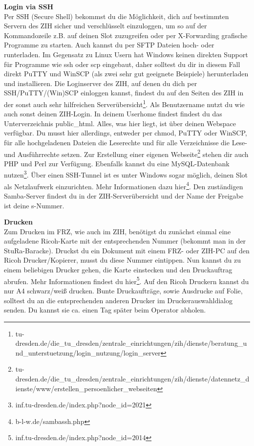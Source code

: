 \textbf{Login via SSH} \\
Per SSH (Secure Shell) bekommst du die Möglichkeit, dich auf bestimmten Servern des ZIH sicher und verschlüsselt einzuloggen, um so auf der Kommandozeile z.B. auf deinen Slot zuzugreifen oder per X-Forwarding grafische Programme zu starten.
Auch kannst du per SFTP Dateien hoch- oder runterladen.
Im Gegensatz zu Linux Usern hat Windows keinen direkten Support für Programme wie ssh oder scp eingebaut, daher solltest du dir in diesem Fall direkt PuTTY und WinSCP (als zwei sehr gut geeignete Beispiele) herunterladen und installieren.
Die Loginserver des ZIH, auf denen du dich per SSH/PuTTY/(Win)SCP einloggen kannst, findest du auf den Seiten des ZIH in der sonst auch sehr hilfreichen Serverübersicht\footnote{tu-dresden.de/die\_tu\_dresden/zentrale\_einrichtungen/zih/dienste/beratung\_und\_unterstuetzung/login\_nutzung/login\_server}.
Als Benutzername nutzt du wie auch sonst deinen ZIH-Login.
In deinem Userhome findest findest du das Unterverzeichnis public\_html.
Alles, was hier liegt, ist über deinen Webspace verfügbar.
Du musst hier allerdings, entweder per chmod, PuTTY oder WinSCP, für alle hochgeladenen Dateien die Leserechte und für alle Verzeichnisse die Lese- und Ausführrechte setzen.
Zur Erstellung einer eigenen Webseite\footnote{tu-dresden.de/die\_tu\_dresden/zentrale\_einrichtungen/zih/dienste/datennetz\_dienste/www/erstellen\_persoenlicher\_webseiten} stehen dir auch PHP und Perl zur Verfügung.
Ebenfalls kannst du eine MySQL-Datenbank nutzen\footnote{inf.tu-dresden.de/index.php?node\_id=2021}.
Über einen SSH-Tunnel ist es unter Windows sogar möglich, deinen Slot als Netzlaufwerk einzurichten.
Mehr Informationen dazu hier\footnote{b-l-w.de/sambassh.php}.
Den zuständigen Samba-Server findest du in der ZIH-Serverübersicht und der Name der Freigabe ist deine s-Nummer.

\textbf{Drucken} \\
Zum Drucken im FRZ, wie auch im ZIH, benötigst du zunächst einmal eine aufgeladene Ricoh-Karte mit der entsprechenden Nummer (bekommt man in der StuRa-Baracke).
Druckst du ein Dokument mit einem FRZ- oder ZIH-PC auf den Ricoh Drucker/Kopierer, musst du diese Nummer eintippen.
Nun kannst du zu einem beliebigen Drucker gehen, die Karte einstecken und den Druckauftrag abrufen.
Mehr Informationen findest du hier\footnote{inf.tu-dresden.de/index.php?node\_id=2014}.
Auf den Ricoh Druckern kannst du nur A4 schwarz/weiß drucken.
Bunte Druckaufträge, sowie Ausdrucke auf Folie, solltest du an die entsprechenden anderen Drucker im Druckerauswahldialog senden.
Du kannst sie ca. einen Tag später beim Operator abholen.

